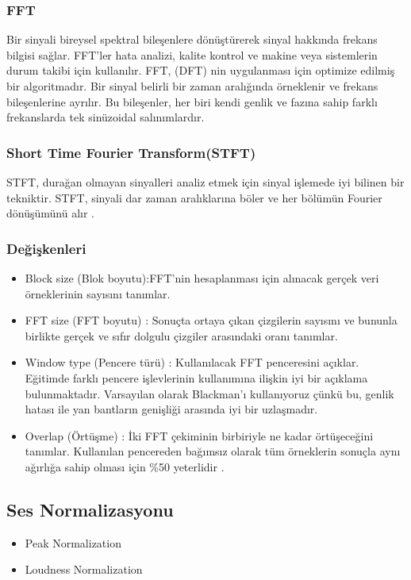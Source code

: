 \documentclass[12pt, a4paper]{article}
\begin{document}
			\subsubsection{FFT} 	\vspace*{1\baselineskip}
			Bir sinyali bireysel spektral bileşenlere dönüştürerek sinyal hakkında frekans bilgisi sağlar. FFT'ler hata analizi, kalite kontrol ve makine veya sistemlerin durum takibi için kullanılır. FFT, (DFT) nin  uygulanması için optimize edilmiş bir algoritmadır. Bir sinyal belirli bir zaman aralığında örneklenir ve frekans bileşenlerine ayrılır. Bu bileşenler, her biri kendi genlik ve fazına sahip farklı frekanslarda tek sinüzoidal salınımlardır\cite{fft}. 
			\vspace*{2\baselineskip}
			
			\subsubsection{Short Time Fourier Transform(STFT)}
			STFT, durağan olmayan sinyalleri analiz etmek için sinyal işlemede iyi bilinen bir tekniktir. STFT, sinyali dar zaman aralıklarına böler ve her bölümün Fourier dönüşümünü alır \cite{thirdStft}. 
			\subsubsection{Değişkenleri}
			\begin{itemize}
				\item Block size (Blok boyutu):FFT'nin hesaplanması için alınacak gerçek veri örneklerinin sayısını tanımlar.
				\item FFT size (FFT boyutu) : Sonuçta ortaya çıkan çizgilerin sayısını ve bununla birlikte gerçek ve sıfır dolgulu çizgiler arasındaki oranı tanımlar.
				\item Window type (Pencere türü) : Kullanılacak FFT penceresini açıklar. Eğitimde farklı pencere işlevlerinin kullanımına ilişkin iyi bir açıklama bulunmaktadır. Varsayılan olarak Blackman'ı kullanıyoruz çünkü bu, genlik hatası ile yan bantların genişliği arasında iyi bir uzlaşmadır.
				\item Overlap (Örtüşme)	: İki FFT çekiminin birbiriyle ne kadar örtüşeceğini tanımlar. Kullanılan pencereden bağımsız olarak tüm örneklerin sonuçla aynı ağırlığa sahip olması için \%50 yeterlidir \cite{bl}.
			\end{itemize}
			
			\vspace*{2\baselineskip}
			\subsection{Ses Normalizasyonu}
			\begin{itemize}
				\item Peak Normalization
				\item Loudness Normalization
			\end{itemize}
			
\end{document}

